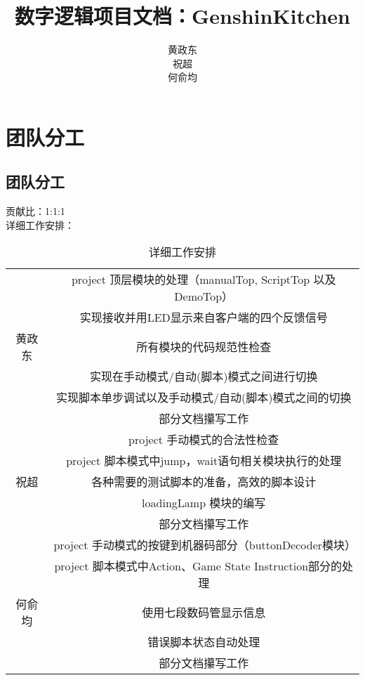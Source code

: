 \documentclass[12pt, a4paper]{ctexart}
\title{数字逻辑项目文档：GenshinKitchen}
\author{黄政东\\祝超\\何俞均}
\date{}
\begin{document}
\maketitle

\newpage
\section{团队分工}
\subsection{团队分工}
贡献比：1:1:1\\
详细工作安排：
\begin{table}[h]
	\centering
	\begin{tabular}{|c|c|}
		\hline
		~      & project 顶层模块的处理（manualTop, ScriptTop 以及 DemoTop） \\
		\cline{2-2}
		~      & 实现接收并用LED显示来自客户端的四个反馈信号                 \\
		\cline{2-2}
		黄政东 & 所有模块的代码规范性检查                                    \\
		\cline{2-2}
		~      & 实现在手动模式/自动(脚本)模式之间进行切换                   \\
		\cline{2-2}
		~      & 实现脚本单步调试以及手动模式/自动(脚本)模式之间的切换         \\
		\cline{2-2}
		~      & 部分文档攥写工作                                            \\
		\hline

		~      & project 手动模式的合法性检查                                \\
		\cline{2-2}
		~      & project 脚本模式中jump，wait语句相关模块执行的处理          \\
		\cline{2-2}
		祝超   & 各种需要的测试脚本的准备，高效的脚本设计                    \\
		\cline{2-2}
		~      & loadingLamp 模块的编写                                      \\
		\cline{2-2}
		~      & 部分文档攥写工作                                            \\

		\hline
		~      & project 手动模式的按键到机器码部分（buttonDecoder模块）     \\
		\cline{2-2}
		~      & project 脚本模式中Action、Game State Instruction部分的处理  \\
		\cline{2-2}
		何俞均 & 使用七段数码管显示信息                   \\
		\cline{2-2}
		~      & 错误脚本状态自动处理                                        \\
		\cline{2-2}
		~      & 部分文档攥写工作                                            \\
		\hline
	\end{tabular}
	\caption{详细工作安排}
\end{table}
\end{document}
